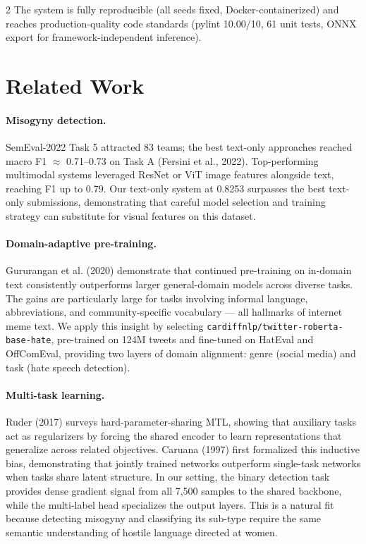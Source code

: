 \documentclass[11pt]{article}
\begin{document}
\begin{multicols}{2}
The system is fully reproducible (all seeds fixed, Docker-containerized) and reaches production-quality code standards (pylint 10.00/10, 61 unit tests, ONNX export for framework-independent inference).

\section{Related Work}

\paragraph{Misogyny detection.}
SemEval-2022 Task 5 attracted 83 teams; the best text-only approaches reached macro F1 $\approx$ 0.71–0.73 on Task A (Fersini et al., 2022). Top-performing multimodal systems leveraged ResNet or ViT image features alongside text, reaching F1 up to 0.79. Our text-only system at 0.8253 surpasses the best text-only submissions, demonstrating that careful model selection and training strategy can substitute for visual features on this dataset.

\paragraph{Domain-adaptive pre-training.}
Gururangan et al. (2020) demonstrate that continued pre-training on in-domain text consistently outperforms larger general-domain models across diverse tasks. The gains are particularly large for tasks involving informal language, abbreviations, and community-specific vocabulary — all hallmarks of internet meme text. We apply this insight by selecting \texttt{cardiffnlp/}\allowbreak\texttt{twitter-roberta-base-hate}, pre-trained on 124M tweets and fine-tuned on HatEval and OffComEval, providing two layers of domain alignment: genre (social media) and task (hate speech detection).

\paragraph{Multi-task learning.}
Ruder (2017) surveys hard-parameter-sharing MTL, showing that auxiliary tasks act as regularizers by forcing the shared encoder to learn representations that generalize across related objectives. Caruana (1997) first formalized this inductive bias, demonstrating that jointly trained networks outperform single-task networks when tasks share latent structure. In our setting, the binary detection task provides dense gradient signal from all 7{,}500 samples to the shared backbone, while the multi-label head specializes the output layers. This is a natural fit because detecting misogyny and classifying its sub-type require the same semantic understanding of hostile language directed at women.


\end{multicols}
\end{document}
